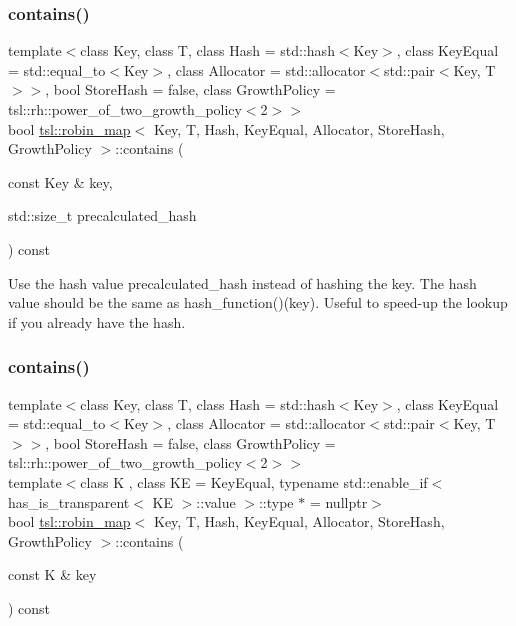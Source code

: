 \subsubsection{\texorpdfstring{contains()}{contains()}\hspace{0.1cm}{\footnotesize\ttfamily [1/3]}}
{\footnotesize\ttfamily template$<$class Key, class T, class Hash = std\+::hash$<$\+Key$>$, class Key\+Equal = std\+::equal\+\_\+to$<$\+Key$>$, class Allocator = std\+::allocator$<$std\+::pair$<$\+Key, T$>$$>$, bool Store\+Hash = false, class Growth\+Policy = tsl\+::rh\+::power\+\_\+of\+\_\+two\+\_\+growth\+\_\+policy$<$2$>$$>$ \\
bool \mbox{\hyperlink{classtsl_1_1robin__map}{tsl\+::robin\+\_\+map}}$<$ Key, T, Hash, Key\+Equal, Allocator, Store\+Hash, Growth\+Policy $>$\+::contains (\begin{DoxyParamCaption}\item[{const Key \&}]{key,  }\item[{std\+::size\+\_\+t}]{precalculated\+\_\+hash }\end{DoxyParamCaption}) const\hspace{0.3cm}{\ttfamily [inline]}}

Use the hash value \textquotesingle{}precalculated\+\_\+hash\textquotesingle{} instead of hashing the key. The hash value should be the same as hash\+\_\+function()(key). Useful to speed-\/up the lookup if you already have the hash. \mbox{\label{classtsl_1_1robin__map_a51feaed365e7e64d92fee10dfbe42d26}} 
\subsubsection{\texorpdfstring{contains()}{contains()}\hspace{0.1cm}{\footnotesize\ttfamily [2/3]}}
{\footnotesize\ttfamily template$<$class Key, class T, class Hash = std\+::hash$<$\+Key$>$, class Key\+Equal = std\+::equal\+\_\+to$<$\+Key$>$, class Allocator = std\+::allocator$<$std\+::pair$<$\+Key, T$>$$>$, bool Store\+Hash = false, class Growth\+Policy = tsl\+::rh\+::power\+\_\+of\+\_\+two\+\_\+growth\+\_\+policy$<$2$>$$>$ \\
template$<$class K , class KE  = Key\+Equal, typename std\+::enable\+\_\+if$<$ has\+\_\+is\+\_\+transparent$<$ K\+E $>$\+::value $>$\+::type $\ast$  = nullptr$>$ \\
bool \mbox{\hyperlink{classtsl_1_1robin__map}{tsl\+::robin\+\_\+map}}$<$ Key, T, Hash, Key\+Equal, Allocator, Store\+Hash, Growth\+Policy $>$\+::contains (\begin{DoxyParamCaption}\item[{const K \&}]{key }\end{DoxyParamCaption}) const\hspace{0.3cm}{\ttfamily [inline]}}

